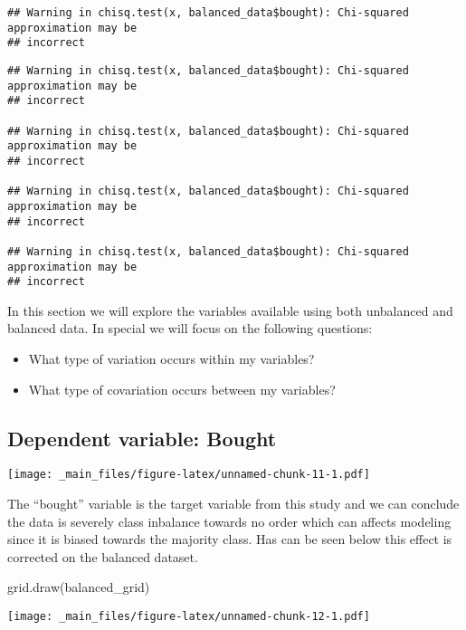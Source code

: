\documentclass[
]{book}
\newenvironment{Shaded}{\begin{snugshade}}{\end{snugshade}}
\newcommand{\FunctionTok}[1]{\textcolor[rgb]{0.00,0.00,0.00}{#1}}
\newcommand{\NormalTok}[1]{#1}
\providecommand{\tightlist}{%
  \setlength{\itemsep}{0pt}\setlength{\parskip}{0pt}}
\begin{document}
\begin{verbatim}
## Warning in chisq.test(x, balanced_data$bought): Chi-squared approximation may be
## incorrect
\end{verbatim}

\begin{verbatim}
## Warning in chisq.test(x, balanced_data$bought): Chi-squared approximation may be
## incorrect

## Warning in chisq.test(x, balanced_data$bought): Chi-squared approximation may be
## incorrect

## Warning in chisq.test(x, balanced_data$bought): Chi-squared approximation may be
## incorrect

## Warning in chisq.test(x, balanced_data$bought): Chi-squared approximation may be
## incorrect
\end{verbatim}

In this section we will explore the variables available using both unbalanced and balanced data. In special we will focus on the following questions:

\begin{itemize}
\tightlist
\item
  What type of variation occurs within my variables?
\item
  What type of covariation occurs between my variables?
\end{itemize}

\hypertarget{dependent-variable-bought}{%
\subsection{Dependent variable: Bought}\label{dependent-variable-bought}}

\texttt{[image: \_main\_files/figure-latex/unnamed-chunk-11-1.pdf]}

The ``bought'' variable is the target variable from this study and we can conclude the data is severely class inbalance towards no order which can affects modeling since it is biased towards the majority class. Has can be seen below this effect is corrected on the balanced dataset.

\begin{Shaded}
\begin{Highlighting}[]
\FunctionTok{grid.draw}\NormalTok{(balanced\_grid)}
\end{Highlighting}
\end{Shaded}

\texttt{[image: \_main\_files/figure-latex/unnamed-chunk-12-1.pdf]}
\end{document}
